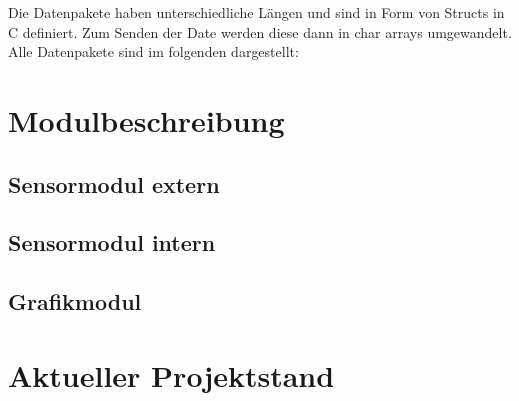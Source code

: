 \documentclass[a4paper,11pt]{article}
\begin{document}
\noindent
Die Datenpakete haben unterschiedliche Längen und sind in Form von Structs in C definiert. Zum Senden der Date werden diese dann in char arrays umgewandelt. \\
Alle Datenpakete sind im folgenden dargestellt:




\section{Modulbeschreibung}
\label{sub:modulbeschreibung}

\subsection{Sensormodul extern}
\label{subsub:sensorModul_ext}

\subsection{Sensormodul intern}
\label{subsub:sensorModul_int}

\subsection{Grafikmodul}
\label{subsub:grafikmodul}

\section{Aktueller Projektstand}
\end{document}
